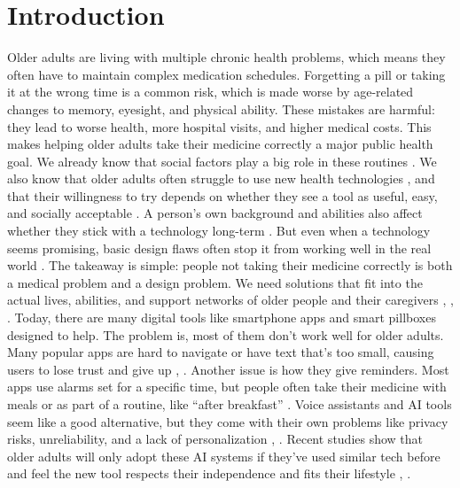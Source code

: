 \documentclass[acmlarge]{acmart}
\begin{document}
\section{Introduction}
Older adults are living with multiple chronic health problems, which means they often have to maintain complex medication schedules. Forgetting a pill or taking it at the wrong time is a common risk, which is made worse by age-related changes to memory,
eyesight, and physical ability. These mistakes are harmful: they lead to worse health, more
hospital visits, and higher medical costs. This makes helping older adults take their medicine
correctly a major public health goal.
We already know that social factors play a big role in these routines \cite{Bastani01122021}. We also know that
older adults often struggle to use new health technologies \cite{Ahmad2022}, and that their willingness to try
depends on whether they see a tool as useful, easy, and socially acceptable \cite{info:doi/10.2196/65269}. A person's
own background and abilities also affect whether they stick with a technology long-term \cite{10.1093/geront/gny113}.
But even when a technology seems promising, basic design flaws often stop it from working
well in the real world \cite{10.1145/174800.174808}. The takeaway is simple: people not taking their medicine correctly
is both a medical problem and a design problem. We need solutions that fit into the actual
lives, abilities, and support networks of older people and their caregivers \cite{info:doi/10.2196/65776}, \cite{TURJAMAA2020677}, \cite{10.1007/978-3-642-02774-1_77}.
Today, there are many digital tools like smartphone apps and smart pillboxes designed to
help. The problem is, most of them don’t work well for older adults. Many popular apps are
hard to navigate or have text that’s too small, causing users to lose trust and give up \cite{doi:10.1177/1541931213601769}, \cite{10.1145/2556288.2557079}.
Another issue is how they give reminders. Most apps use alarms set for a specific time, but
people often take their medicine with meals or as part of a routine, like “after breakfast” \cite{10.1145/3636534.3698116}.
Voice assistants and AI tools seem like a good alternative, but they come with their own
problems like privacy risks, unreliability, and a lack of personalization \cite{10.1145/3623809.3623827}, \cite{10.1145/3706598.3713578}. Recent
studies show that older adults will only adopt these AI systems if they’ve used similar tech
before and feel the new tool respects their independence and fits their lifestyle \cite{10.1145/3700794.3700803}, \cite{10.1007/978-3-031-24667-8_7}.
\end{document}
